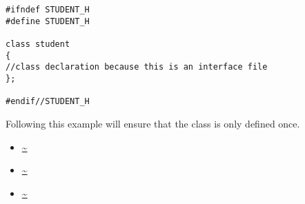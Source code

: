 \begin{lstlisting}
#ifndef STUDENT_H
#define STUDENT_H

class student
{
//class declaration because this is an interface file
};

#endif//STUDENT_H
\end{lstlisting}

Following this example will ensure that the  class is only defined once.











\begin{itemize}
\item \url{~}
\item \url{~}
\item \url{~}
\end{itemize}	

